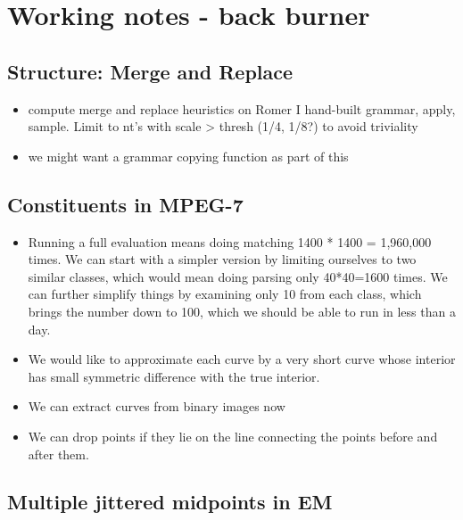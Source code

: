 \documentclass{book}
\begin{document}
\chapter{Working notes - back burner}
\label{sec-6}
\section{Structure: Merge and Replace}
\label{sec-6_1}

\begin{itemize}
\item compute merge and replace heuristics on Romer I hand-built
    grammar, apply, sample. Limit to nt's with scale > thresh (1/4,
    1/8?) to avoid triviality
\item we might want a grammar copying function as part of this
\end{itemize}
\section{Constituents in MPEG-7}
\label{sec-6_2}

\begin{itemize}
\item Running a full evaluation means doing matching 1400 * 1400 =
    1,960,000 times. We can start with a simpler version by limiting
    ourselves to two similar classes, which would mean doing parsing
    only 40*40=1600 times. We can further simplify things by examining
    only 10 from each class, which brings the number down to 100,
    which we should be able to run in less than a day.
\item We would like to approximate each curve by a very short curve
    whose interior has small symmetric difference with the true
    interior.
\item We can extract curves from binary images now
\item We can drop points if they lie on the line connecting the points
    before and after them.
\end{itemize}
      
\section{Multiple jittered midpoints in EM}
\label{sec-6_3}
\end{document}
